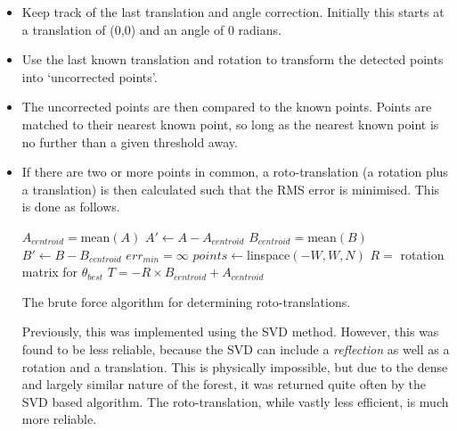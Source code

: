\documentclass[12pt,oneside,a4paper]{book}
\begin{document}
\begin{itemize}
\item Keep track of the last translation and angle correction. Initially
  this starts at a translation of (0,0) and an angle of 0 radians.
\item Use the last known translation and rotation to transform the
  detected points into `uncorrected points'.
\item The uncorrected points are then compared to the known
  points. Points are matched to their nearest known point, so long as
  the nearest known point is no further than a given threshold away.
\item If there are two or more points in common, a roto-translation (a
  rotation plus a translation) is then calculated such that the RMS
  error is minimised. This is done as follows.

  \IncMargin{1em}
  \begin{algorithm}
    \BlankLine
    $A_{centroid} = $mean$(A)$\;
    $A' \leftarrow A - A_{centroid}$\;
    $B_{centroid} = $mean$(B)$\;
    $B' \leftarrow B - B_{centroid}$\;
    \BlankLine
    $err_{min} = \infty$ \;
    $points \leftarrow $linspace$(-W, W, N)$ \;
    \BlankLine
    \BlankLine
    $R = $ rotation matrix for $\theta_{best}$ \;
    $T = -R \times B_{centroid} + A_{centroid}$\;
    \BlankLine
    \caption{The brute force algorithm for determining roto-translations.}
  \end{algorithm}
 
  Previously, this was implemented using the \gls{SVD}
  method. However, this was found to be less reliable,
  because the SVD can include a \emph{reflection} as well as a
  rotation and a translation. This is physically impossible, but due
  to the dense and largely similar nature of the forest, it was
  returned quite often by the SVD based algorithm. The
  roto-translation, while vastly less efficient, is much more reliable.



\end{itemize}
\end{document}
